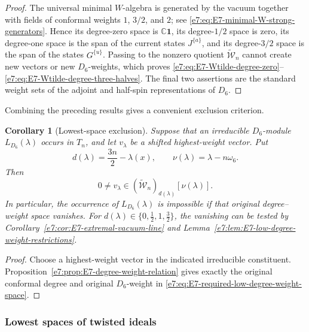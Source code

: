 \documentclass[11pt,reqno]{amsart}
\newtheorem{corollary}[theorem]{Corollary}
\theoremstyle{definition}
\theoremstyle{remark}
\begin{document}
\begin{proof}
The universal minimal \(W\)-algebra is generated by the vacuum together
with fields of conformal weights \(1\), \(3/2\), and \(2\); see
\eqref{e7:eq:E7-minimal-W-strong-generators}.  Hence its degree-zero space is
\(\mathbb C\mathbf1\), its degree-\(1/2\) space is zero, its degree-one
space is the span of the current states \(J^{\{a\}}\), and its
degree-\(3/2\) space is the span of the states \(G^{\{u\}}\).  Passing to
the nonzero quotient \(\widetilde{\mathcal W}_n\) cannot create new
vectors or new \(D_6\)-weights, which proves
\eqref{e7:eq:E7-Wtilde-degree-zero}--
\eqref{e7:eq:E7-Wtilde-degree-three-halves}.  The final two assertions are the
standard weight sets of the adjoint and half-spin representations of
\(D_6\).
\end{proof}

Combining the preceding results gives a convenient exclusion criterion.

\begin{corollary}[Lowest-space exclusion]
\label{e7:cor:E7-lowest-space-exclusion-criterion}
Suppose that an irreducible \(D_6\)-module \(L_{D_6}(\lambda)\) occurs in
\(T_n\), and let \(v_\lambda\) be a shifted highest-weight vector.  Put
\begin{equation*}
  d(\lambda)=\frac{3n}{2}-\lambda(x),
  \qquad
  \nu(\lambda)=\lambda-n\omega_6.
\end{equation*}
Then
\begin{equation}
  0\ne v_\lambda
  \in
  (\widetilde{\mathcal W}_n)_{d(\lambda)}
  [\nu(\lambda)].
  \label{e7:eq:E7-required-low-degree-weight-space}
\end{equation}
In particular, the occurrence of \(L_{D_6}(\lambda)\) is impossible if
that original degree--weight space vanishes.  For
\(d(\lambda)\in\{0,\frac12,1,\frac32\}\), the vanishing can be tested by
Corollary~\ref{e7:cor:E7-extremal-vacuum-line} and
Lemma~\ref{e7:lem:E7-low-degree-weight-restrictions}.
\end{corollary}

\begin{proof}
Choose a highest-weight vector in the indicated irreducible constituent.
Proposition~\ref{e7:prop:E7-degree-weight-relation} gives exactly the original
conformal degree and original \(D_6\)-weight in
\eqref{e7:eq:E7-required-low-degree-weight-space}.
\end{proof}

\subsubsection{Lowest spaces of twisted ideals}
\end{document}
